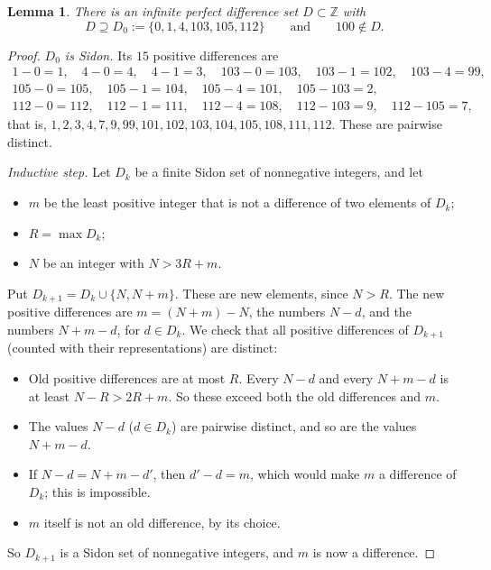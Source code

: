 \documentclass[11pt]{article}
\newtheorem{lemma}[theorem]{Lemma}
\theoremstyle{definition}
\theoremstyle{remark}
\newcommand{\Z}{\mathbb{Z}}
\begin{document}
\begin{lemma}\label{lem:diffset}
There is an infinite perfect difference set $D\subset\Z$ with
\[
D\supseteq D_0:=\{0,1,4,103,105,112\}\qquad\text{and}\qquad 100\notin D.
\]
\end{lemma}

\begin{proof}
\emph{$D_0$ is Sidon.} Its $15$ positive differences are
\[
\begin{gathered}
1-0=1,\quad 4-0=4,\quad 4-1=3,\quad 103-0=103,\quad 103-1=102,\quad 103-4=99,\\
105-0=105,\quad 105-1=104,\quad 105-4=101,\quad 105-103=2,\\
112-0=112,\quad 112-1=111,\quad 112-4=108,\quad 112-103=9,\quad 112-105=7,
\end{gathered}
\]
that is, $1,2,3,4,7,9,99,101,102,103,104,105,108,111,112$. These are pairwise distinct.

\emph{Inductive step.} Let $D_k$ be a finite Sidon set of nonnegative integers, and let

\begin{itemize}[nosep]
\item $m$ be the least positive integer that is not a difference of two elements of $D_k$;
\item $R=\max D_k$;
\item $N$ be an integer with $N>3R+m$.
\end{itemize}
Put $D_{k+1}=D_k\cup\{N,N+m\}$. These are new elements, since $N>R$. The new positive differences are $m=(N+m)-N$, the numbers $N-d$, and the numbers $N+m-d$, for $d\in D_k$. We check that all positive differences of $D_{k+1}$ (counted with their representations) are distinct:
\begin{itemize}[nosep]
\item Old positive differences are at most $R$. Every $N-d$ and every $N+m-d$ is at least $N-R>2R+m$. So these exceed both the old differences and $m$.
\item The values $N-d$ ($d\in D_k$) are pairwise distinct, and so are the values $N+m-d$.
\item If $N-d=N+m-d'$, then $d'-d=m$, which would make $m$ a difference of $D_k$; this is impossible.
\item $m$ itself is not an old difference, by its choice.
\end{itemize}
So $D_{k+1}$ is a Sidon set of nonnegative integers, and $m$ is now a difference.


\end{proof}
\end{document}
